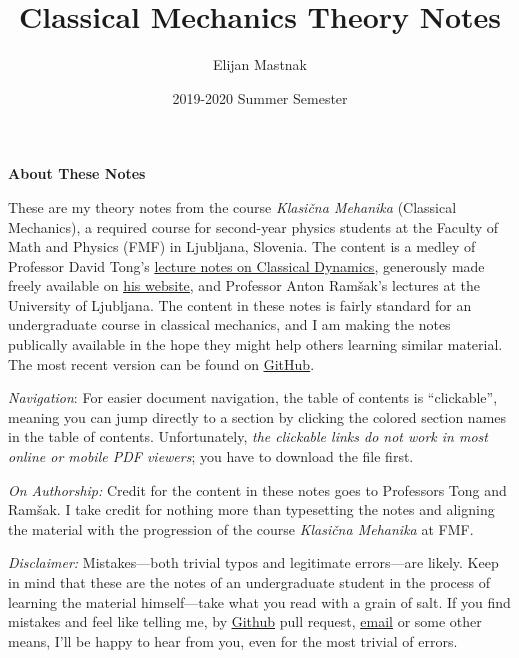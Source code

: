 \documentclass[11pt, a4paper]{article}
\begin{document}
\title{Classical Mechanics Theory Notes}
\author{Elijan Mastnak}
\date{2019-2020 Summer Semester}
\maketitle

\begin{center}
	\textbf{About These Notes}
\end{center}

These are my theory notes from the course \textit{Klasi\v{c}na Mehanika} (Classical Mechanics), a required course for second-year physics students at the Faculty of Math and Physics (FMF) in Ljubljana, Slovenia. The content is a medley of  Professor David Tong's \href{http://www.damtp.cam.ac.uk/user/tong/dynamics.html}{\underline{lecture notes on Classical Dynamics}}, generously made freely available on \href{http://www.damtp.cam.ac.uk/user/tong/teaching.html}{\underline{his website}}, and Professor Anton Ram\v{s}ak's lectures at the University of Ljubljana.  The content in these notes is fairly standard for an undergraduate course in classical mechanics, and I am making the notes publically available in the hope they might help others learning similar material. The most recent version can be found on \href{https://github.com/ejmastnak/fmf/tree/main/classical-mechanics}{\underline{GitHub}}.

\vspace{2mm}
\textit{Navigation}: For easier document navigation, the table of contents is ``clickable'', meaning you can jump directly to a section by clicking the colored section names in the table of contents. Unfortunately, \textit{the clickable links do not work in most online or mobile PDF viewers}; you have to download the file first.

\vspace{2mm}
\textit{On Authorship:} Credit for the content in these notes goes to Professors Tong and Ram\v{s}ak. I take credit for nothing more than typesetting the notes and aligning the material with the progression of the course \textit{Klasi\v{c}na Mehanika} at FMF.

\vspace{2mm}
\textit{Disclaimer:} Mistakes---both trivial typos and legitimate errors---are likely. Keep in mind that these are the notes of an undergraduate student in the process of learning the material himself---take what you read with a grain of salt. If you find mistakes and feel like telling me, by \href{https://github.com/ejmastnak/fmf}{\underline{Github}} pull request, \href{mailto:ejmastnak@gmail.com}{\underline{email}} or some other means, I'll be happy to hear from you, even for the most trivial of errors.
\end{document}
